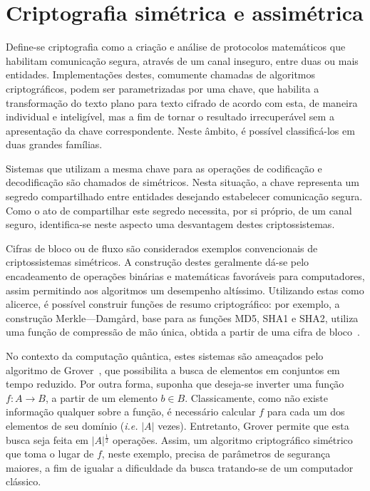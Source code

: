 \documentclass{ufsctex/ufsctex}
\newcommand{\length}[1]{\vert{} #1 \vert{}}
\begin{document}
\section{Criptografia simétrica e assimétrica}\label{section:crypto}

Define-se criptografia como a criação e análise de protocolos matemáticos que
habilitam comunicação segura, através de um canal inseguro, entre duas ou mais
entidades. Implementações destes, comumente chamadas de algoritmos
criptográficos, podem ser parametrizadas por uma chave, que habilita a
transformação do texto plano para texto cifrado de acordo com esta, de maneira
individual e inteligível, mas a fim de tornar o resultado irrecuperável sem a
apresentação da chave correspondente.  Neste âmbito, é possível classificá-los
em duas grandes famílias.

Sistemas que utilizam a mesma chave para as operações de codificação e
decodificação são chamados de simétricos. Nesta situação, a chave representa um
segredo compartilhado entre entidades desejando estabelecer comunicação segura.
Como o ato de compartilhar este segredo necessita, por si próprio, de um canal
seguro, identifica-se neste aspecto uma desvantagem destes criptossistemas.

Cifras de bloco ou de fluxo são considerados exemplos convencionais de
criptossistemas simétricos.  A construção destes geralmente dá-se pelo
encadeamento de operações binárias e matemáticas favoráveis para computadores,
assim permitindo aos algoritmos um desempenho altíssimo. Utilizando estas como
alicerce, é possível construir funções de resumo criptográfico: por exemplo, a
construção Merkle---Damgård, base para as funções MD5,
SHA1 e SHA2, utiliza uma função de
compressão de mão única, obtida a partir de uma cifra de
bloco~\cite[9.41]{Menezes:1996:HAC:548089}.

No contexto da computação quântica, estes sistemas são ameaçados pelo algoritmo
de Grover~\cite{Grover:1996:FQM:237814.237866}, que possibilita a busca de
elementos em conjuntos em tempo reduzido.  Por outra forma, suponha que
deseja-se inverter uma função $f : A \longrightarrow B$, a partir de um
elemento $b \in B$. Classicamente, como não existe informação qualquer sobre a
função, é necessário calcular $f$ para cada um dos elementos de seu domínio
(\emph{i.e.} $\length{A}$\simbolo{$\length{\omega}$}{Tamanho da palavra
$\omega$} vezes). Entretanto, Grover permite que esta busca seja feita em
$\length{A}^{\frac{1}{2}}$ operações. Assim, um algoritmo criptográfico
simétrico que toma o lugar de $f$, neste exemplo, precisa de parâmetros de
segurança maiores, a fim de igualar a dificuldade da busca tratando-se de um
computador clássico.
\end{document}
